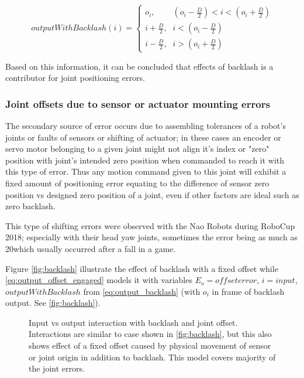 \documentclass[english, printversion, nomenclature, notitle]{tuvisionthesis} %
\begin{document}
\begin{equation}
outputWithBacklash(i) = \begin{cases}
\mbox{$o_i$,} & (o_i - \frac{D}{2}) < i < (o_i + \frac{D}{2}) \\
\mbox{$i + \frac{D}{2}$,} & i < (o_i - \frac{D}{2}) \\
\mbox{$i - \frac{D}{2}$,} & i > (o_i + \frac{D}{2})
\end{cases}
\label{eq:output_backlash}
\end{equation}

Based on this information, it can be concluded that effects of backlash is a contributor for joint positioning errors.

\subsubsection{Joint offsets due to sensor or actuator mounting errors}

The secondary source of error occurs due to assembling tolerances of a robot's joints or faults of sensors or shifting of actuator; in these cases an encoder or servo motor belonging to a given joint might not align it's index or "zero" position with joint's intended zero position when commanded to reach it with this type of error. Thus any motion command given to this joint will exhibit a fixed amount of positioning error equating to the difference of sensor zero position vs designed zero position of a joint, even if other factors are ideal such as zero backlash.

This type of shifting errors were observed with the Nao Robots during RoboCup 2018; especially with their head yaw joints, sometimes the error being as much as 20\degree which usually occurred after a fall in a game.

Figure \ref{fig:backlash} illustrate the effect of backlash with a fixed offset while \cref{eq:output_offset_engaged} models it with variables $E_o = offset error$, $i = input$, $outputWithBacklash$ from \cref{eq:output_backlash} (with $o_i$ in frame of backlash output. See \cref{fig:backlash}).

\begin{figure}
	\def\svgwidth{\linewidth}
	
	\caption{Input vs output interaction with backlash and joint offset. Interactions are similar to case shown in \ref{fig:backlash}, but this also shows effect of a fixed offset caused by physical movement of sensor or joint origin in addition to backlash. This model covers majority of the joint errors.}
	\label{fig:backlash_offset}
\end{figure}
\end{document}
